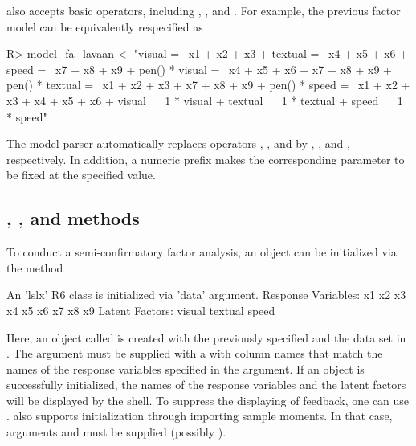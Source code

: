 \documentclass[nojss]{jss}
\begin{document}
 also accepts basic  operators, including \code{~}, \code{=~}, and \code{~~}. For example, the previous factor model can be equivalently respecified as
\begin{Schunk}
\begin{Sinput}
R> model_fa_lavaan <- "visual  =~ x1 + x2 + x3
+                      textual =~ x4 + x5 + x6
+                      speed   =~ x7 + x8 + x9
+                      pen() * visual  =~ x4 + x5 + x6 + x7 + x8 + x9
+                      pen() * textual =~ x1 + x2 + x3 + x7 + x8 + x9
+                      pen() * speed   =~ x1 + x2 + x3 + x4 + x5 + x6
+                      visual  ~~ 1 * visual
+                      textual ~~ 1 * textual
+                      speed   ~~ 1 * speed"
\end{Sinput}
\end{Schunk}
The model parser automatically replaces  operators \code{~}, \code{=~}, and \code{~~} by \code{<=}, \code{:=>}, and \code{<=>}, respectively. In addition, a numeric prefix makes the corresponding parameter to be fixed at the specified value. 


\subsection[new(), fit(), and summarize() methods ]{, , and  methods}
To conduct a semi-confirmatory factor analysis, an  object can be initialized via the  method
\begin{Schunk}
\begin{Soutput}
An 'lslx' R6 class is initialized via 'data' argument. 
  Response Variables: x1 x2 x3 x4 x5 x6 x7 x8 x9 
  Latent Factors: visual textual speed 
\end{Soutput}
\end{Schunk}
Here, an  object called  is created with the previously specified  and the data set  in . The  argument must be supplied with a  with column names that match the names of the response variables specified in the  argument. If an  object is successfully initialized, the names of the response variables and the latent factors will be displayed by the shell. To suppress the displaying of feedback, one can use .  also supports initialization through importing sample moments. In that case, arguments  and  must be supplied (possibly ). 
\end{document}
